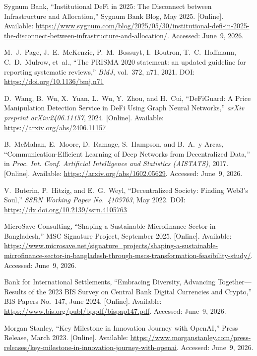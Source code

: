 \documentclass[12pt, a4paper]{report}
\begin{document}
{\begin{enumerate}[label={[\arabic*]}]
\item Sygnum Bank, ``Institutional DeFi in 2025: The Disconnect between Infrastructure and Allocation,'' Sygnum Bank Blog, May 2025. [Online]. Available: \url{https://www.sygnum.com/blog/2025/05/30/institutional-defi-in-2025-the-disconnect-between-infrastructure-and-allocation/}. Accessed: June~9, 2026.

\item M.~J.~Page, J.~E.~McKenzie, P.~M.~Bossuyt, I.~Boutron, T.~C.~Hoffmann, C.~D.~Mulrow, et~al., ``The PRISMA 2020 statement: an updated guideline for reporting systematic reviews,'' \textit{BMJ}, vol.~372, n71, 2021. DOI: \url{https://doi.org/10.1136/bmj.n71}

\item D.~Wang, B.~Wu, X.~Yuan, L.~Wu, Y.~Zhou, and H.~Cui, ``DeFiGuard: A Price Manipulation Detection Service in DeFi Using Graph Neural Networks,'' \textit{arXiv preprint arXiv:2406.11157}, 2024. [Online]. Available: \url{https://arxiv.org/abs/2406.11157}

\item B.~McMahan, E.~Moore, D.~Ramage, S.~Hampson, and B.~A.~y Arcas, ``Communication-Efficient Learning of Deep Networks from Decentralized Data,'' in \textit{Proc. Int. Conf. Artificial Intelligence and Statistics (AISTATS)}, 2017. [Online]. Available: \url{https://arxiv.org/abs/1602.05629}. Accessed: June~9, 2026.

\item V.~Buterin, P.~Hitzig, and E.~G.~Weyl, ``Decentralized Society: Finding Web3's Soul,'' \textit{SSRN Working Paper No.~4105763}, May 2022. DOI: \url{https://dx.doi.org/10.2139/ssrn.4105763}

\item MicroSave Consulting, ``Shaping a Sustainable Microfinance Sector in Bangladesh,'' MSC Signature Project, September 2025. [Online]. Available: \url{https://www.microsave.net/signature_projects/shaping-a-sustainable-microfinance-sector-in-bangladesh-through-mscs-transformation-feasibility-study/}. Accessed: June~9, 2026.

\item Bank for International Settlements, ``Embracing Diversity, Advancing Together---Results of the 2023 BIS Survey on Central Bank Digital Currencies and Crypto,'' BIS Papers No.~147, June 2024. [Online]. Available: \url{https://www.bis.org/publ/bppdf/bispap147.pdf}. Accessed: June~9, 2026.

\item Morgan Stanley, ``Key Milestone in Innovation Journey with OpenAI,'' Press Release, March 2023. [Online]. Available: \url{https://www.morganstanley.com/press-releases/key-milestone-in-innovation-journey-with-openai}. Accessed: June~9, 2026.


\end{enumerate}}
\end{document}
